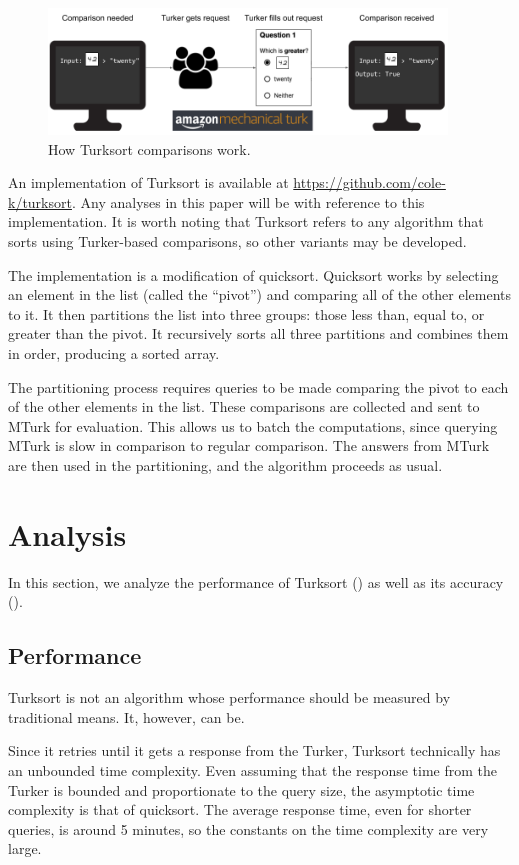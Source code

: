 \documentclass{article}
\begin{document}
\begin{figure}
  \centering
  \includegraphics[width=300pt]{diagram-1.png}
  \caption{How Turksort comparisons work.}
  \label{fig:comparison}
\end{figure}

An implementation of Turksort is available at
\url{https://github.com/cole-k/turksort}. Any analyses in this paper will be
with reference to this implementation. It is worth noting that Turksort refers
to any algorithm that sorts using Turker-based comparisons, so other variants
may be developed.

The implementation is a modification of quicksort. Quicksort works by selecting
an element in the list (called the ``pivot'') and comparing all of the other
elements to it. It then partitions the list into three groups: those less than,
equal to, or greater than the pivot. It recursively sorts all three partitions
and combines them in order, producing a sorted array.

The partitioning process requires queries to be made comparing the pivot to each
of the other elements in the list. These comparisons are collected and sent to
MTurk for evaluation. This allows us to batch the computations, since querying
MTurk is slow in comparison to regular comparison. The answers from MTurk are
then used in the partitioning, and the algorithm proceeds as usual.

\section{Analysis}

In this section, we analyze the performance of Turksort ()
as well as its accuracy ().

\subsection{Performance}\label{sec:performance}
Turksort is not an algorithm whose performance should be measured by traditional
means. It, however, can be.

Since it retries until it gets a response from the Turker, Turksort technically
has an unbounded time complexity. Even assuming that the response time from the
Turker is bounded and proportionate to the query size, the asymptotic time
complexity is that of quicksort. The average response time, even for shorter
queries, is around 5 minutes, so the constants on the time complexity are very
large.
\end{document}
